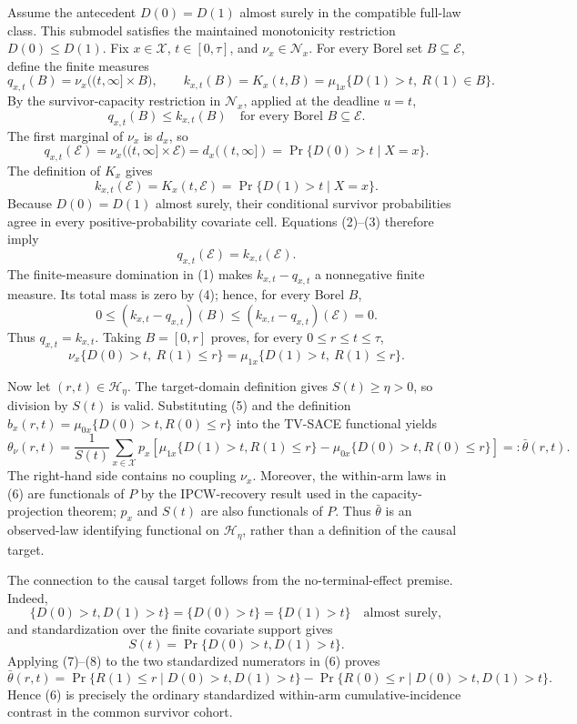 Assume the antecedent \(D(0)=D(1)\) almost surely in the compatible full-law class.  This submodel satisfies the maintained monotonicity restriction \(D(0)\leq D(1)\).  Fix \(x\in\mathcal X\), \(t\in[0,\tau]\), and \(\nu_x\in\mathcal N_x\).  For every Borel set \(B\subseteq\mathcal E\), define the finite measures
\[
q_{x,t}(B)=\nu_x\bigl((t,\infty]\times B\bigr),
\qquad
k_{x,t}(B)=K_x(t,B)
=\mu_{1x}\{D(1)>t,\ R(1)\in B\}.
\]
By the survivor-capacity restriction in \(\mathcal N_x\), applied at the deadline \(u=t\),
\[
q_{x,t}(B)\leq k_{x,t}(B)
\quad\text{for every Borel }B\subseteq\mathcal E. \tag{1}
\]
The first marginal of \(\nu_x\) is \(d_x\), so
\[
q_{x,t}(\mathcal E)
=\nu_x\bigl((t,\infty]\times\mathcal E\bigr)
=d_x((t,\infty])
=\Pr\{D(0)>t\mid X=x\}. \tag{2}
\]
The definition of \(K_x\) gives
\[
k_{x,t}(\mathcal E)
=K_x(t,\mathcal E)
=\Pr\{D(1)>t\mid X=x\}. \tag{3}
\]
Because \(D(0)=D(1)\) almost surely, their conditional survivor probabilities agree in every positive-probability covariate cell.  Equations (2)--(3) therefore imply
\[
q_{x,t}(\mathcal E)=k_{x,t}(\mathcal E). \tag{4}
\]
The finite-measure domination in (1) makes \(k_{x,t}-q_{x,t}\) a nonnegative finite measure.  Its total mass is zero by (4); hence, for every Borel \(B\),
\[
0\leq (k_{x,t}-q_{x,t})(B)
\leq (k_{x,t}-q_{x,t})(\mathcal E)=0.
\]
Thus \(q_{x,t}=k_{x,t}\).  Taking \(B=[0,r]\) proves, for every \(0\leq r\leq t\leq\tau\),
\[
\nu_x\{D(0)>t,\ R(1)\leq r\}
=\mu_{1x}\{D(1)>t,\ R(1)\leq r\}. \tag{5}
\]

Now let \((r,t)\in\mathcal H_\eta\).  The target-domain definition gives \(S(t)\geq\eta>0\), so division by \(S(t)\) is valid.  Substituting (5) and the definition
\(b_x(r,t)=\mu_{0x}\{D(0)>t,R(0)\leq r\}\) into the TV-SACE functional yields
\[
\theta_\nu(r,t)
=\frac{1}{S(t)}\sum_{x\in\mathcal X}p_x
\left[
\mu_{1x}\{D(1)>t,R(1)\leq r\}
-\mu_{0x}\{D(0)>t,R(0)\leq r\}
\right]
=:\bar\theta(r,t). \tag{6}
\]
The right-hand side contains no coupling \(\nu_x\).  Moreover, the within-arm laws in (6) are functionals of \(P\) by the IPCW-recovery result used in the capacity-projection theorem; \(p_x\) and \(S(t)\) are also functionals of \(P\).  Thus \(\bar\theta\) is an observed-law identifying functional on \(\mathcal H_\eta\), rather than a definition of the causal target.

The connection to the causal target follows from the no-terminal-effect premise.  Indeed,
\[
\{D(0)>t,D(1)>t\}=\{D(0)>t\}=\{D(1)>t\}
\quad\text{almost surely}, \tag{7}
\]
and standardization over the finite covariate support gives
\[
S(t)=\Pr\{D(0)>t,D(1)>t\}. \tag{8}
\]
Applying (7)--(8) to the two standardized numerators in (6) proves
\[
\bar\theta(r,t)
=\Pr\{R(1)\leq r\mid D(0)>t,D(1)>t\}
-\Pr\{R(0)\leq r\mid D(0)>t,D(1)>t\}. \tag{9}
\]
Hence (6) is precisely the ordinary standardized within-arm cumulative-incidence contrast in the common survivor cohort.

